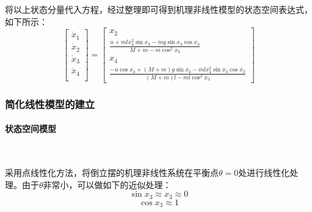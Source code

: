 \documentclass[UTF8]{article}
\begin{document}
将以上状态分量代入方程，经过整理即可得到机理非线性模型的状态空间表达式，如下所示：
\begin{equation*}
	\begin{bmatrix}
		\dot{x}_1 \\
		\dot{x}_2 \\
		\dot{x}_3 \\
		\dot{x}_4 \\
	\end{bmatrix} = 
	\begin{bmatrix}
		x_2 \\
		\frac{u + mlx_4^2\sin x_3 - mg\sin x_3 \cos x_3}{M + m - m\cos^2x_3} \\
		x_4 \\
		\frac{-u\cos x_3 + (M + m)g\sin x_3 - mlx_4^2\sin x_3\cos x_3}{(M + m)l - ml\cos^2x_3} 
	\end{bmatrix}
\end{equation*}

\subsubsection{简化线性模型的建立}
\paragraph{状态空间模型}~{}

采用点线性化方法，将倒立摆的机理非线性系统在平衡点$\theta = 0$处进行线性化处理。由于$\theta$非常小，可以做如下的近似处理：
\begin{equation*}
	\sin x_3 \approx x_3 \approx 0 
\end{equation*}
\begin{equation*}
	\cos x_3 \approx 1 
\end{equation*}
\end{document}
